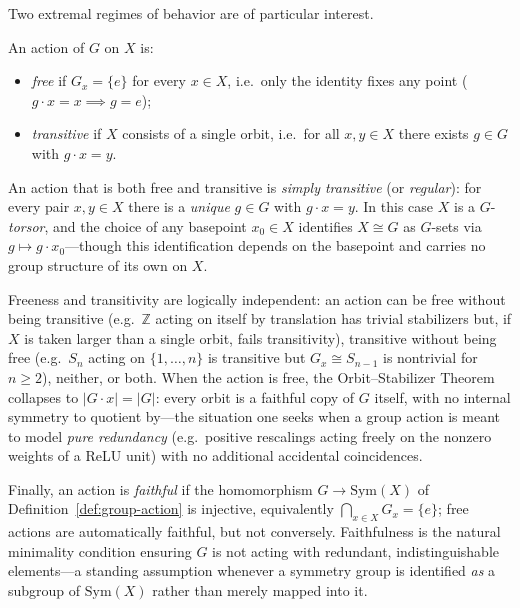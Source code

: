 \documentclass[mathematics,review,submit,moreauthors]{Definitions/mdpi}
\begin{document}
Two extremal regimes of behavior are of particular interest.

\begin{Definition}
\label{def:free-transitive}
An action of $G$ on $X$ is:
\begin{itemize}
    \item \emph{free} if $G_x = \{e\}$ for every $x \in X$, i.e.\ only the
    identity fixes any point ($g \cdot x = x \implies g = e$);
    \item \emph{transitive} if $X$ consists of a single orbit, i.e.\ for all
    $x, y \in X$ there exists $g \in G$ with $g \cdot x = y$.
\end{itemize}
An action that is both free and transitive is \emph{simply transitive} (or
\emph{regular}): for every pair $x, y \in X$ there is a \emph{unique}
$g \in G$ with $g \cdot x = y$. In this case $X$ is a $G$-\emph{torsor}, and
the choice of any basepoint $x_0 \in X$ identifies $X \cong G$ as $G$-sets via
$g \mapsto g \cdot x_0$---though this identification depends on the
basepoint and carries no group structure of its own on $X$.
\end{Definition}

Freeness and transitivity are logically independent: an action can be free
without being transitive (e.g.\ $\mathbb{Z}$ acting on itself by translation
has trivial stabilizers but, if $X$ is taken larger than a single orbit,
fails transitivity), transitive without being free (e.g.\ $S_n$ acting on
$\{1,\dots,n\}$ is transitive but $G_x \cong S_{n-1}$ is nontrivial for
$n \geq 2$), neither, or both. When the action is free, the Orbit--Stabilizer
Theorem collapses to $|G \cdot x| = |G|$: every orbit is a faithful copy of
$G$ itself, with no internal symmetry to quotient by---the situation one
seeks when a group action is meant to model \emph{pure redundancy} (e.g.\
positive rescalings acting freely on the nonzero weights of a ReLU unit) with
no additional accidental coincidences.

Finally, an action is \emph{faithful} if the homomorphism
$G \to \mathrm{Sym}(X)$ of Definition~\ref{def:group-action} is injective,
equivalently $\bigcap_{x \in X} G_x = \{e\}$; free actions are automatically
faithful, but not conversely. Faithfulness is the natural minimality
condition ensuring $G$ is not acting with redundant, indistinguishable
elements---a standing assumption whenever a symmetry group is identified
\emph{as} a subgroup of $\mathrm{Sym}(X)$ rather than merely mapped into it.
\end{document}
